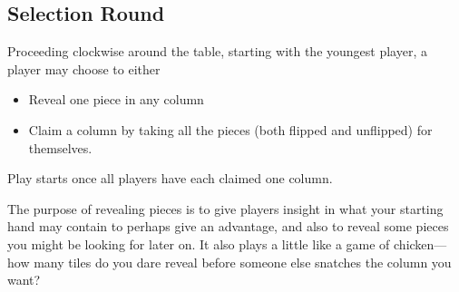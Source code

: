 \subsection{Selection Round}

Proceeding clockwise around the table, starting with the youngest player, a player may choose to either 
\begin{itemize} 
\item Reveal one piece in any column
\item Claim a column by taking all the pieces (both flipped and unflipped) for themselves.
\end{itemize}
Play starts once all players have each claimed one column.

\aside The purpose of revealing pieces is to give players insight in what your starting hand may contain to perhaps give an advantage, and also to reveal some pieces you might be looking for later on. It also plays a little like a game of chicken---how many tiles do you dare reveal before someone else snatches the column you want?